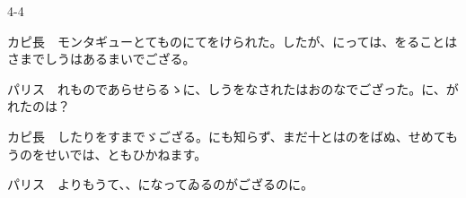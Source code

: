 \documentclass[tate,paper=b6j,jafontsize=9pt]{jlreq}
\begin{document}
\begin{azconvIndented}{4\zw}{-4\zw}

カピ長　モンタギューとてものにてをけられた。したが、にっては、をることはさまでしうはあるまいでござる。

パリス　れものであらせらるゝに、しうをなされたはおのなでござった。に、がれたのは？

カピ長　したりをすまでゞござる。にも知らず、まだ十とはのをばぬ、せめてもうのをせいでは、ともひかねます。

パリス　よりもうて、、になってゐるのがござるのに。


\end{azconvIndented}
\end{document}
